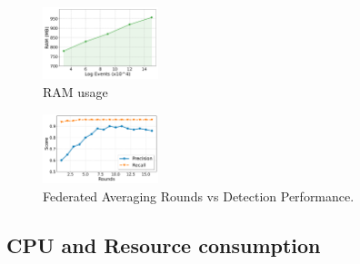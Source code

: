 \begin{figure}[t!]
  \centering
  \includegraphics[width=0.30\textwidth]{fig/ram.pdf}
  \caption{RAM usage}
  \label{ram}
  \vspace{-2ex}
\end{figure}

\begin{figure}[t!]
  \centering
  \includegraphics[width=0.30\textwidth]{fig/roundsvsscore.pdf}
  \caption{Federated Averaging Rounds vs Detection Performance.}
  \label{ram}
  \vspace{-2ex}
\end{figure}

\subsection*{CPU and Resource consumption}

